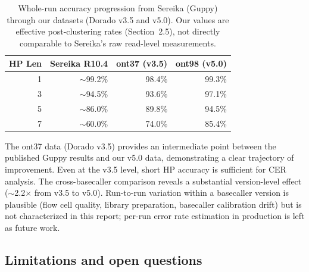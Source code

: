\documentclass[11pt]{article}
\begin{document}
\begin{table}[h]
\centering
\caption{Whole-run accuracy progression from Sereika (Guppy) through our
datasets (Dorado v3.5 and v5.0). Our values are effective post-clustering
rates (Section~2.5), not directly comparable to Sereika's raw read-level
measurements.}
\begin{tabular}{rrrr}
\toprule
HP Len & Sereika R10.4 & ont37 (v3.5) & ont98 (v5.0) \\
\midrule
1 & ${\sim}$99.2\% & 98.4\% & 99.3\% \\
3 & ${\sim}$94.5\% & 93.6\% & 97.1\% \\
5 & ${\sim}$86.0\% & 89.8\% & 94.5\% \\
7 & ${\sim}$60.0\% & 74.0\% & 85.4\% \\
\bottomrule
\end{tabular}
\end{table}

The ont37 data (Dorado v3.5) provides an intermediate point between the
published Guppy results and our v5.0 data, demonstrating a clear trajectory
of improvement. Even at the v3.5 level, short HP accuracy is sufficient for
CER analysis. The cross-basecaller comparison reveals a substantial
version-level effect (${\sim}$2.2$\times$ from v3.5 to v5.0). Run-to-run
variation within a basecaller version is plausible (flow cell quality,
library preparation, basecaller calibration drift) but is not characterized
in this report; per-run error rate estimation in production is left as
future work.

\subsection{Limitations and open questions}
\end{document}
